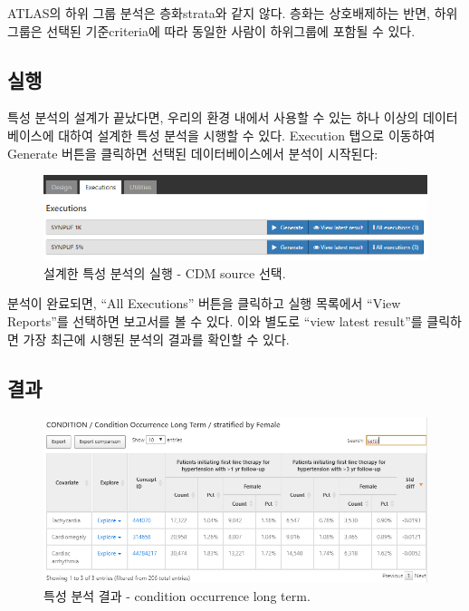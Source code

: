 \documentclass[10.5pt]{book}
\theoremstyle{definition}
\theoremstyle{definition}
\theoremstyle{definition}
\theoremstyle{remark}
\let\BeginKnitrBlock\begin \let\EndKnitrBlock\end
\begin{document}
\BeginKnitrBlock{rmdimportant}
ATLAS의 하위 그룹 분석은 층화strata와 같지 않다. 층화는 상호배제하는
반면, 하위그룹은 선택된 기준criteria에 따라 동일한 사람이 하위그룹에
포함될 수 있다.
\EndKnitrBlock{rmdimportant}

\subsection{실행}

특성 분석의 설계가 끝났다면, 우리의 환경 내에서 사용할 수 있는 하나
이상의 데이터베이스에 대하여 설계한 특성 분석을 시행할 수 있다.
Execution 탭으로 이동하여 Generate 버튼을 클릭하면 선택된
데이터베이스에서 분석이 시작된다:

\begin{figure}

{\centering \includegraphics[width=1\linewidth]{images/Characterization/atlasCharacterizationExecutions} 

}

\caption{설계한 특성 분석의 실행 - CDM source 선택.}\label{fig:atlasCharacterizationExecutions}
\end{figure}

분석이 완료되면, ``All Executions'' 버튼을 클릭하고 실행 목록에서 ``View
Reports''를 선택하면 보고서를 볼 수 있다. 이와 별도로 ``view latest
result''를 클릭하면 가장 최근에 시행된 분석의 결과를 확인할 수 있다.

\subsection{결과}\label{-1}

\begin{figure}

{\centering \includegraphics[width=1\linewidth]{images/Characterization/atlasCharacterizationResultsSummary} 

}

\caption{특성 분석 결과 - condition occurrence long term.}\label{fig:atlasCharacterizationResultsSummary}
\end{figure}
\end{document}
